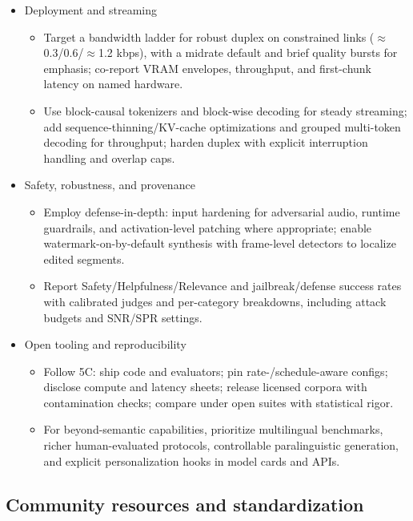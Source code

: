 \documentclass{article}
\begin{document}
\begin{itemize}
  \item Deployment and streaming
  \begin{itemize}
    \item Target a bandwidth ladder for robust duplex on constrained links ($\approx$0.3/0.6/$\approx$1.2 kbps), with a midrate default and brief quality bursts for emphasis; co-report VRAM envelopes, throughput, and first-chunk latency on named hardware.
    \item Use block-causal tokenizers and block-wise decoding for steady streaming; add sequence-thinning/KV-cache optimizations and grouped multi-token decoding for throughput; harden duplex with explicit interruption handling and overlap caps.
  \end{itemize}

  \item Safety, robustness, and provenance
  \begin{itemize}
    \item Employ defense-in-depth: input hardening for adversarial audio, runtime guardrails, and activation-level patching where appropriate; enable watermark-on-by-default synthesis with frame-level detectors to localize edited segments.
    \item Report Safety/Helpfulness/Relevance and jailbreak/defense success rates with calibrated judges and per-category breakdowns, including attack budgets and SNR/SPR settings.
  \end{itemize}

  \item Open tooling and reproducibility
  \begin{itemize}
    \item Follow 5C: ship code and evaluators; pin rate-/schedule-aware configs; disclose compute and latency sheets; release licensed corpora with contamination checks; compare under open suites with statistical rigor.
    \item For beyond-semantic capabilities, prioritize multilingual benchmarks, richer human-evaluated protocols, controllable paralinguistic generation, and explicit personalization hooks in model cards and APIs.
  \end{itemize}

\end{itemize}



\subsection{Community resources and standardization} \label{subsec:communityresourcesandstandardization}
\end{document}
